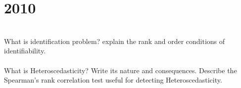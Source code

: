 \section*{2010}
\vspace{-.5cm}
\hrulefill \smallskip\\
 What is identification problem? explain the rank and order conditions of identifiability.
\\\\
 What is Heteroscedasticity? Write its nature and consequences. Describe the Spearman's rank correlation test useful for detecting Heteroscedasticity.

